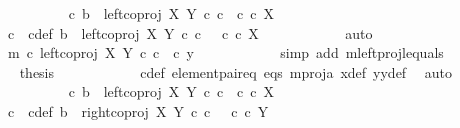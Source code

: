 \begin{isabellebody}
\ \ \ \ \ \ \ \ \isamarkupfalse%
\ {\isachardoublequoteopen}{\isasymexists}c{\isachardot}{\kern0pt}\ b\ {\isacharequal}{\kern0pt}\ left{\isacharunderscore}{\kern0pt}coproj\ X\ Y\ {\isasymcirc}\isactrlsub c\ c\ {\isasymand}\ c\ {\isasymin}\isactrlsub c\ X{\isachardoublequoteclose}\isanewline
\ \ \ \ \ \ \ \ \isamarkupfalse%
\ \isamarkupfalse%
\ c\ \ c{\isacharunderscore}{\kern0pt}def{\isacharcolon}{\kern0pt}\ {\isachardoublequoteopen}b\ {\isacharequal}{\kern0pt}\ left{\isacharunderscore}{\kern0pt}coproj\ X\ Y\ {\isasymcirc}\isactrlsub c\ c\ \ {\isasymand}\ c\ {\isasymin}\isactrlsub c\ X{\isachardoublequoteclose}\isanewline
\ \ \ \ \ \ \ \ \ \ \isamarkupfalse%
\ auto\isanewline
\ \ \ \ \ \ \ \ \isamarkupfalse%
\ \isamarkupfalse%
\ {\isachardoublequoteopen}m\ {\isasymcirc}\isactrlsub c\ left{\isacharunderscore}{\kern0pt}coproj\ X\ Y\ {\isasymcirc}\isactrlsub c\ c\ {\isacharequal}{\kern0pt}\ {\isasymlangle}c{\isacharcomma}{\kern0pt}\ y{}{\isasymrangle}{\isachardoublequoteclose}\isanewline
\ \ \ \ \ \ \ \ \ \ \isamarkupfalse%
\ {\isacharparenleft}{\kern0pt}simp\ add{\isacharcolon}{\kern0pt}\ m{\isacharunderscore}{\kern0pt}leftproj{\isacharunderscore}{\kern0pt}l{\isacharunderscore}{\kern0pt}equals{\isacharparenright}{\kern0pt}\isanewline
\ \ \ \ \ \ \ \ \isamarkupfalse%
\ \isamarkupfalse%
\ {\isacharquery}{\kern0pt}thesis\isanewline
\ \ \ \ \ \ \ \ \ \ \isamarkupfalse%
\ c{\isacharunderscore}{\kern0pt}def\ element{\isacharunderscore}{\kern0pt}pair{\isacharunderscore}{\kern0pt}eq\ eqs\ m{\isacharunderscore}{\kern0pt}proj{\isacharunderscore}{\kern0pt}a\ x{\isacharunderscore}{\kern0pt}def\ y{}y{}{\isacharunderscore}{\kern0pt}def{\isacharparenleft}{\kern0pt}{}{\isacharparenright}{\kern0pt}\ \isamarkupfalse%
\ auto\isanewline
\ \ \ \ \ \ \isamarkupfalse%
\isanewline
\ \ \ \ \ \ \ \ \isamarkupfalse%
\ {\isachardoublequoteopen}{\isasymnexists}c{\isachardot}{\kern0pt}\ b\ {\isacharequal}{\kern0pt}\ left{\isacharunderscore}{\kern0pt}coproj\ X\ Y\ {\isasymcirc}\isactrlsub c\ c\ {\isasymand}\ c\ {\isasymin}\isactrlsub c\ X{\isachardoublequoteclose}\isanewline
\ \ \ \ \ \ \ \ \isamarkupfalse%
\ \isamarkupfalse%
\ c\ \ c{\isacharunderscore}{\kern0pt}def{\isacharcolon}{\kern0pt}\ {\isachardoublequoteopen}b\ {\isacharequal}{\kern0pt}\ right{\isacharunderscore}{\kern0pt}coproj\ X\ Y\ {\isasymcirc}\isactrlsub c\ c\ \ {\isasymand}\ c\ {\isasymin}\isactrlsub c\ Y{\isachardoublequoteclose}\isanewline

\end{isabellebody}
